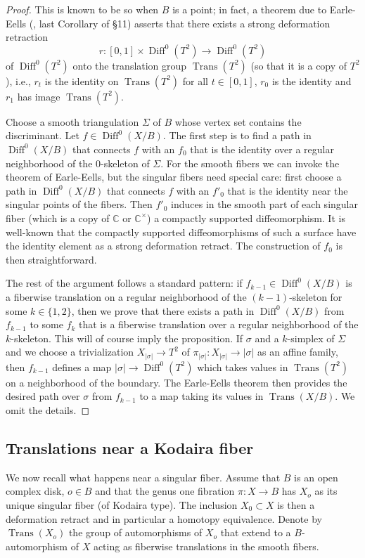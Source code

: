 \documentclass[10pt,letterpaper]{amsart}
\numberwithin{equation}{section}
\def\CC{{\mathbb C}}
\newcommand\Diff{\operatorname{Diff}}
\newcommand\Trans{\operatorname{Trans}}
\theoremstyle{remark}
\begin{document}
\begin{proof}
This is known to be so when $B$ is a point; in fact, a theorem due to 
Earle-Eells (\cite{EE}, last Corollary of \S 11) asserts that there exists a strong deformation retraction 
\[r: [0,1]\times \Diff^0(T^2)\to \Diff^0(T^2)\] of $\Diff^0(T^2)$  onto the translation group $\Trans(T^2)$ (so that it is a copy of $T^2$),  i.e., 
$r_t$ is the identity on  $\Trans(T^2)$ for all $t\in [0,1]$,  $r_0$ is the identity and $r_1$ has image $\Trans(T^2)$. 

Choose a smooth triangulation $\Sigma$ of $B$ whose vertex set contains the discriminant.
Let $f \in\Diff^0(X/B)$. The first step is to find a path in $\Diff^0(X/B)$ that connects $f$ with an $f_0$ that is
the identity over a regular neighborhood of the $0$-skeleton of $\Sigma$. For the smooth fibers we can 
invoke the theorem of Earle-Eells, but the singular fibers need special care:  
first choose a path in $\Diff^0(X/B)$ that connects $f$ with an $f'_0$ that is the identity near the singular points of the fibers. Then $f'_0$ induces in the smooth part of each singular fiber (which is a copy of $\CC$ or $\CC^\times$) a compactly supported  diffeomorphism. It  is well-known that the compactly supported  diffeomorphisms of such a surface have the identity element as a strong deformation retract. The construction of $f_0$ is then straightforward.

The rest of the argument follows a standard  pattern: if  $f_{k-1}\in \Diff^0(X/B)$ is  a fiberwise translation on a regular neighborhood of the $(k-1)$-skeleton for some  $k\in \{1,2\}$, then we prove that  there exists a path in $ \Diff^0(X/B)$ from $f_{k-1}$ to some $f_k$ that  is a fiberwise translation over a regular neighborhood of the $k$-skeleton. This will of course imply the proposition. 
If $\sigma$ and  a $k$-simplex of $\Sigma$ and we choose a trivialization $X_{|\sigma|}\to T^2$  of $\pi_{|\sigma|}: X_{|\sigma|}\to |\sigma|$ as an affine family, then $f_{k-1}$ defines a map
$ |\sigma|\to \Diff^0(T^2)$ which takes values in $\Trans(T^2)$ on a neighborhood of the boundary. The Earle-Eells theorem then provides 
the  desired path over $\sigma$ from
$f_{k-1}$ to a map taking its values in $\Trans(X/B)$. We omit the details.
\end{proof}

\subsection{Translations near a Kodaira fiber}
We now recall what happens near a singular fiber. Assume that  $B$ is an open complex disk, $o\in B$ and that  the genus one fibration 
$\pi:X\to B$ has  $X_o$ 
as its unique singular fiber (of Kodaira type). The inclusion $X_0\subset X$ is then a deformation retract and in particular a homotopy equivalence.  
Denote by  $\Trans(X_o)$ the group of  automorphisms of 
$X_o$ that extend to a $B$-automorphism of $X$ acting  as  fiberwise translations in the smooth fibers. 
\end{document}
